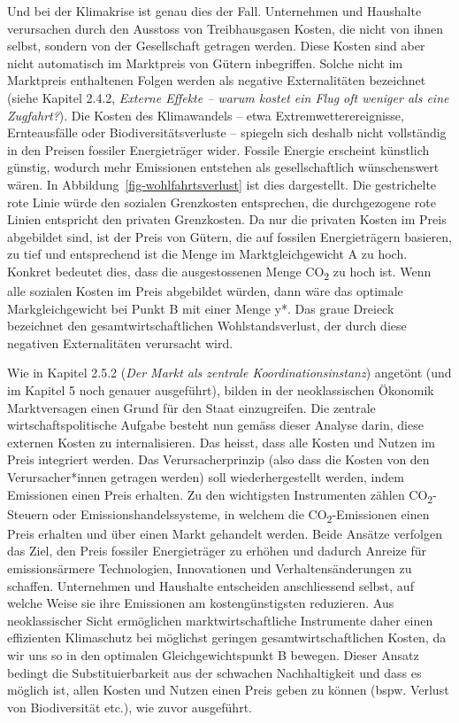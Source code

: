 \documentclass[
  nswissgerman,
  a4paper,
  DIV=11,
  numbers=noendperiod,
  oneside,
  openany]{scrreprt}
\begin{document}
Und bei der Klimakrise ist genau dies der Fall. Unternehmen und
Haushalte verursachen durch den Ausstoss von Treibhausgasen Kosten, die
nicht von ihnen selbst, sondern von der Gesellschaft getragen werden.
Diese Kosten sind aber nicht automatisch im Marktpreis von Gütern
inbegriffen. Solche nicht im Marktpreis enthaltenen Folgen werden als
negative Externalitäten bezeichnet (siehe Kapitel 2.4.2, \emph{Externe
Effekte -- warum kostet ein Flug oft weniger als eine Zugfahrt?}). Die
Kosten des Klimawandels -- etwa Extremwetterereignisse, Ernteausfälle
oder Biodiversitätsverluste -- spiegeln sich deshalb nicht vollständig
in den Preisen fossiler Energieträger wider. Fossile Energie erscheint
künstlich günstig, wodurch mehr Emissionen entstehen als
gesellschaftlich wünschenswert wären. In
Abbildung~\ref{fig-wohlfahrtsverlust} ist dies dargestellt. Die
gestrichelte rote Linie würde den sozialen Grenzkosten entsprechen, die
durchgezogene rote Linien entspricht den privaten Grenzkosten. Da nur
die privaten Kosten im Preis abgebildet sind, ist der Preis von Gütern,
die auf fossilen Energieträgern basieren, zu tief und entsprechend ist
die Menge im Marktgleichgewicht A zu hoch. Konkret bedeutet dies, dass
die ausgestossenen Menge CO\textsubscript{2} zu hoch ist. Wenn alle
sozialen Kosten im Preis abgebildet würden, dann wäre das optimale
Markgleichgewicht bei Punkt B mit einer Menge y*. Das graue Dreieck
bezeichnet den gesamtwirtschaftlichen Wohlstandsverlust, der durch diese
negativen Externalitäten verursacht wird.

Wie in Kapitel 2.5.2 (\emph{Der Markt als zentrale
Koordinationsinstanz}) angetönt (und im Kapitel 5 noch genauer
ausgeführt), bilden in der neoklassischen Ökonomik Marktversagen einen
Grund für den Staat einzugreifen. Die zentrale wirtschaftspolitische
Aufgabe besteht nun gemäss dieser Analyse darin, diese externen Kosten
zu internalisieren. Das heisst, dass alle Kosten und Nutzen im Preis
integriert werden. Das Verursacherprinzip (also dass die Kosten von den
Verursacher*innen getragen werden) soll wiederhergestellt werden, indem
Emissionen einen Preis erhalten. Zu den wichtigsten Instrumenten zählen
CO\textsubscript{2}-Steuern oder Emissionshandelssysteme, in welchem die
CO\textsubscript{2}-Emissionen einen Preis erhalten und über einen Markt
gehandelt werden. Beide Ansätze verfolgen das Ziel, den Preis fossiler
Energieträger zu erhöhen und dadurch Anreize für emissionsärmere
Technologien, Innovationen und Verhaltensänderungen zu schaffen.
Unternehmen und Haushalte entscheiden anschliessend selbst, auf welche
Weise sie ihre Emissionen am kostengünstigsten reduzieren. Aus
neoklassischer Sicht ermöglichen marktwirtschaftliche Instrumente daher
einen effizienten Klimaschutz bei möglichst geringen
gesamtwirtschaftlichen Kosten, da wir uns so in den optimalen
Gleichgewichtspunkt B bewegen. Dieser Ansatz bedingt die
Substituierbarkeit aus der schwachen Nachhaltigkeit und dass es möglich
ist, allen Kosten und Nutzen einen Preis geben zu können (bspw. Verlust
von Biodiversität etc.), wie zuvor ausgeführt.
\end{document}
